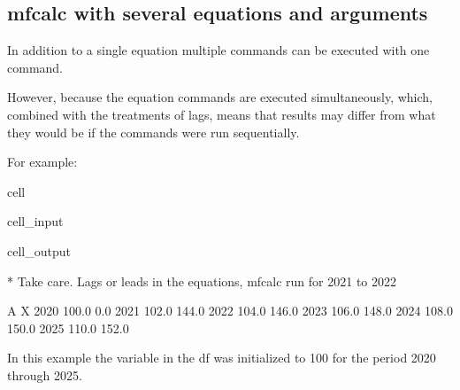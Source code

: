 \documentclass[letterpaper,10pt,english]{jupyterBook}
\begin{document}
\subsection{mfcalc with several equations and arguments}
\label{\detokenize{content/04_PythonEssentials/mfcalc:mfcalc-with-several-equations-and-arguments}}
\sphinxAtStartPar
In addition to a single equation multiple commands can be executed with one command.

\sphinxAtStartPar
However,  because the equation commands are executed simultaneously, which, combined with the treatments of lags, means that results may differ from what they would be if the commands were run sequentially.

\sphinxAtStartPar
For example:

\begin{sphinxuseclass}{cell}\begin{sphinxVerbatimInput}

\begin{sphinxuseclass}{cell_input}
\begin{sphinxVerbatim}[commandchars=\\\{\}]
  


\end{sphinxVerbatim}

\end{sphinxuseclass}\end{sphinxVerbatimInput}
\begin{sphinxVerbatimOutput}

\begin{sphinxuseclass}{cell_output}
\begin{sphinxVerbatim}[commandchars=\\\{\}]
* Take care. Lags or leads in the equations, mfcalc run for 2021 to 2022
\end{sphinxVerbatim}

\begin{sphinxVerbatim}[commandchars=\\\{\}]
          A      X
2020  100.0    0.0
2021  102.0  144.0
2022  104.0  146.0
2023  106.0  148.0
2024  108.0  150.0
2025  110.0  152.0
\end{sphinxVerbatim}

\end{sphinxuseclass}\end{sphinxVerbatimOutput}

\end{sphinxuseclass}
\sphinxAtStartPar
In this example the variable  in the  df was initialized to 100 for the period 2020 through 2025.
\end{document}
